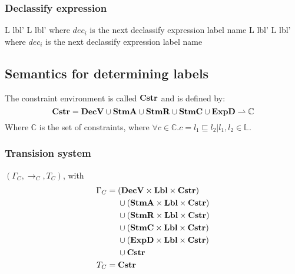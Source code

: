 \subsubsection{Declassify expression}

\begin{trules}
        { {L} {lbl'} }
        { {L} {lbl'} }
        {where $dec_i$ is the next declassify expression label name}
        { {L} {lbl'} }
        { {L} {lbl'} }
        {where $dec_i$ is the next declassify expression label name}
\end{trules}

\subsection{Semantics for determining labels}
The constraint environment is called $\mathbf{Cstr}$ and is defined by:
\[
  \mathbf{Cstr} = \mathbf{DecV} \cup \mathbf{StmA} \cup \mathbf{StmR} \cup \mathbf{StmC} \cup \mathbf{ExpD} \rightharpoonup \mathbb{C}
\]
Where $\mathbb{C}$ is the set of constraints, where $\forall c \in \mathbb{C} . c = l_1 \sqsubseteq l_2 | l_1, l_2 \in \mathbb{L}$.

\subsubsection{Transision system}
$(\Gamma_{C}, \rightarrow_{C}, T_{C})$, with
\begin{align*}
  \Gamma_{C} =  & \;        (\mathbf{DecV} \times \mathbf{Lbl} \times \mathbf{Cstr}) \\
                & \;  \cup  (\mathbf{StmA} \times \mathbf{Lbl} \times \mathbf{Cstr}) \\
                & \;  \cup  (\mathbf{StmR} \times \mathbf{Lbl} \times \mathbf{Cstr}) \\
                & \;  \cup  (\mathbf{StmC} \times \mathbf{Lbl} \times \mathbf{Cstr}) \\
                & \;  \cup  (\mathbf{ExpD} \times \mathbf{Lbl} \times \mathbf{Cstr}) \\
                & \;  \cup   \mathbf{Cstr} \\
  T_{C} =       & \;  \mathbf{Cstr}
\end{align*}


